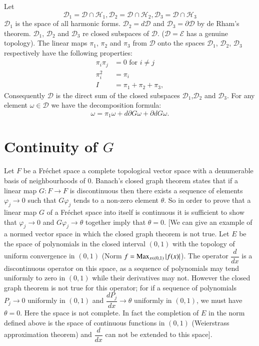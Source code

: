 Let
$$
\mathscr{D}_{1}=\mathscr{D}\cap \mathscr{H}_{1},
\mathscr{D}_{2}=\mathscr{D}\cap \mathscr{H}_{2},
\mathscr{D}_{3}=\mathscr{D}\cap \mathscr{H}_{3}
$$
$\mathscr{D}_{1}$ is the space of all harmonic
forms. $\mathscr{D}_{2}=d\mathscr{D}$ and $\mathscr{D}_{3}=\partial
\mathscr{D}$ by de Rham's theorem. $\mathscr{D}_{1}$,
$\mathscr{D}_{2}$ and $\mathscr{D}_{3}$ re closed subspaces of
$\mathscr{D}$. ($\mathscr{D}=\mathscr{E}$ has a genuine topology). The
linear maps $\pi_{1}$, $\pi_{2}$ and $\pi_{3}$ from $\mathscr{D}$ onto
the spaces $\mathscr{D}_{1}$, $\mathscr{D}_{2}$, $\mathscr{D}_{3}$
respectively have the following properties:
\begin{align*}
\pi_{i}\pi_{j} &= 0\text{ \  for \ } i\neq j\\
 \pi^{2}_{i} &= \pi_{i}\\
 I &= \pi_{1}+\pi_{2}+\pi_{3},
\end{align*}
Consequently $\mathscr{D}$ is the direct sum of the closed subspaces
$\mathscr{D}_{1}$,\break $\mathscr{D}_{2}$ and\pageoriginale
$\mathscr{D}_{3}$. For any element $\omega\in\mathscr{D}$ we have the
decomposition formula:
$$
\omega=\pi_{1}\omega+d\partial G\omega+\partial dG \omega.
$$

\section*{Continuity of $G$}

Let $F$ be a Fr\'echet space \iec a complete topological vector space
with a denumerable basis of neighbourhoods of $0$. Banach's closed
graph theorem states that if a linear map $G:F\to F$ is discontinuous
then there exists a sequence of elements $\varphi_{j}\to 0$ such that
$G\varphi_{j}$ tends to a non-zero element $\theta$. So in order to
prove that a linear map $G$ of a Fr\'echet space into itself is
continuous it is sufficient to show that $\varphi_{j}\to 0$ and
$G\varphi_{j}\to \theta$ together imply that $\theta=0$. [We can give
  an example of a normed vector space in which the closed graph
  theorem is not true. Let $E$ be the space of polynomials in the
  closed interval $(0,1)$ with the topology of uniform convergence in
  $(0,1)$ (Norm $f=\operatorname{Max}\limits_{x\in(0,1)}|f(x)|$). The operator
  $\dfrac{d}{dx}$ is a discontinuous operator on this space, as a
  sequence of polynomials may tend uniformly to zero in $(0,1)$ while
  their derivatives may not. However the closed graph theorem is not
  true for this operator; for if a sequence of polynomials $P_{j}\to 0$
  uniformly in $(0,1)$ and $\dfrac{d P_{j}}{dx}\to\theta$ uniformly in
  $(0,1)$, we must have $\theta=0$. Here the space is not complete. In
  fact the completion of $E$ in the norm defined above is the space of
  continuous functions in $(0,1)$ (Weierstrass approximation theorem)
  and $\dfrac{d}{dx}$ can not be extended to this space].

